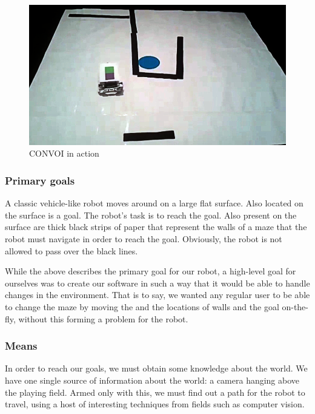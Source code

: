\documentclass[10pt, abstracton, twocolumn]{scrartcl}
\begin{document}
\begin{figure}
        \centering
        \includegraphics[width=\columnwidth]{pictures/photo1convoi.png}
        \caption{\small CONVOI in action}
        \label{fig:photo1convoi}
\end{figure}

\subsubsection{Primary goals}
A classic vehicle-like robot moves around on a large flat surface. Also located on the surface is a goal. The robot's task is to reach the goal. Also present on the surface are thick black strips of paper that represent the walls of a maze that the robot must navigate in order to reach the goal. Obviously, the robot is not allowed to pass over the black lines.

While the above describes the primary goal for our robot, a high-level goal for ourselves was to create our software in such a way that it would be able to handle changes in the environment. That is to say, we wanted any regular user to be able to change the maze by moving the and the locations of walls and the goal on-the-fly, without this forming a problem for the robot.

\subsubsection{Means}

In order to reach our goals, we must obtain some knowledge about the world. We have one single source of information about the world: a camera hanging above the playing field. Armed only with this, we must find out a path for the robot to travel, using a host of interesting techniques from fields such as computer vision.
\end{document}
